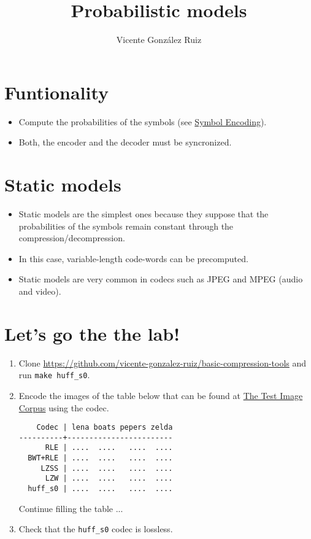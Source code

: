 \title{Probabilistic models}
\author{Vicente González Ruiz}
\maketitle
\tableofcontents

\section{Funtionality}
\begin{itemize}
\item Compute the probabilities of the symbols (see
  \href{https://vicente-gonzalez-ruiz.github.io/symbol_compression/#x1-20001}{Symbol
    Encoding}).
\item Both, the encoder and the decoder must be syncronized.
\end{itemize}

\section{Static models}
\begin{itemize}
\item Static models are the simplest ones because they suppose that
  the probabilities of the symbols remain constant through the
  compression/decompression.
\item In this case, variable-length code-words can be precomputed.
\item Static models are very common in codecs such
  as JPEG and MPEG (audio and video).
\end{itemize}

\section*{Let's go the the lab!}
\begin{enumerate}
\item Clone
  \url{https://github.com/vicente-gonzalez-ruiz/basic-compression-tools}
  and run \texttt{make huff\_s0}.
\item Encode the images of the table below that can be found at
  \href{http://www.hpca.ual.es/~vruiz/images/}{The Test Image
    Corpus} using the codec.
\begin{verbatim}
    Codec | lena boats pepers zelda
----------+------------------------
      RLE | ....  ....   ....  ....
  BWT+RLE | ....  ....   ....  ....
     LZSS | ....  ....   ....  ....
      LZW | ....  ....   ....  ....
  huff_s0 | ....  ....   ....  ....
\end{verbatim}
Continue filling the table ...
\item Check that the \texttt{huff\_s0} codec is lossless.
\end{enumerate}

